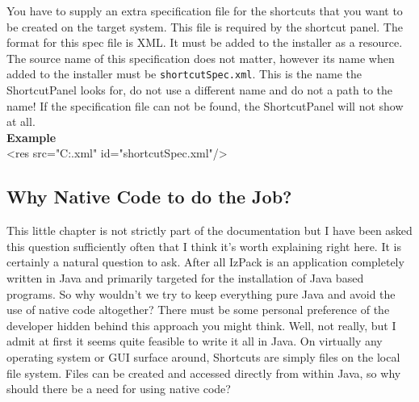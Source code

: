 You have to supply an extra specification file for the shortcuts that
you want to be  created on the target system. This file is required by
the shortcut panel. The format for this spec file is XML. It must be
added to the installer as a resource. The source name of this
specification does not matter, however its name when added to the
installer must be \texttt{shortcutSpec.xml}. This is the name the
ShortcutPanel looks for, do not use a different name and do not a path
to the name! If the specification file can not be found, the
ShortcutPanel will not show at all.\\

\textbf{Example}\\

\footnotesize
    <res src="C:\MyDocuments\Installer\MyShortcutSpec.xml" id="shortcutSpec.xml"/>
\normalsize

\subsection{Why Native Code to do the Job?}

This little chapter is not strictly part of the documentation but I have
been asked this question sufficiently often that I think it's worth
explaining right here. It is certainly a natural question to ask. After
all IzPack is an application completely written in Java and primarily
targeted for the installation of Java based programs. So why wouldn't we
try to keep everything pure Java and avoid the use of native code
altogether? There must be some personal preference of the developer
hidden behind this approach you might think. Well, not really, but I
admit at first it seems quite feasible to write it all in Java. On
virtually any operating system or GUI surface around, Shortcuts are
simply files on the local file system. Files can be created and accessed
directly from within Java, so why should there be a need for using
native code?\\

